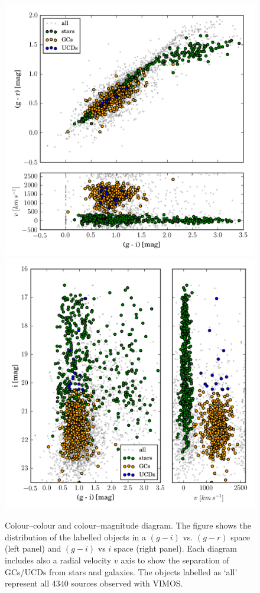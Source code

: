 \documentclass[usenatbib]{mnras}
\begin{document}
\begin{figure}
\centering
\includegraphics[width=\columnwidth]{figures/cc.png}
\includegraphics[width=\columnwidth]{figures/cm.png}
\caption{Colour--colour and colour--magnitude diagram.
The figure shows the
distribution of the labelled objects in a $(g-i)$ vs. $(g-r)$ space (left
panel) and $(g-i)$ vs $i$ space (right panel). Each diagram includes also a
radial velocity $v$ axis to show the separation of GCs/UCDs from stars and
galaxies. The objects labelled as `all' represent all 4340 sources observed with VIMOS.
}
\label{fig:cc}
\end{figure}
\end{document}
